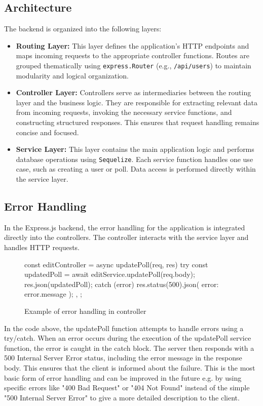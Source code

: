 \documentclass[a4paper,12pt]{report}
\begin{document}
\subsection{Architecture}
The backend is organized into the following layers:
\begin{itemize}
	\item \textbf{Routing Layer:} This layer defines the application's HTTP endpoints and maps incoming requests to the appropriate controller functions. Routes are grouped thematically using \verb|express.Router| (e.g., \verb|/api/users|) to maintain modularity and logical organization.
	
	\item \textbf{Controller Layer:} Controllers serve as intermediaries between the routing layer and the business logic. They are responsible for extracting relevant data from incoming requests, invoking the necessary service functions, and constructing structured responses. This ensures that request handling remains concise and focused.
	
	\item \textbf{Service Layer:} This layer contains the main application logic and performs database operations using \texttt{Sequelize}. Each service function handles one use case, such as creating a user or poll. Data access is performed directly within the service layer.
\end{itemize}
\subsection{Error Handling}
In the Express.js backend, the error handling for the application is integrated directly into the controllers. The controller interacts with the service layer and handles HTTP requests. 
\begin{figure}[H]
	\begin{code}
		const editController = {
			async updatePoll(req, res) {
				try {
					const updatedPoll = await editService.updatePoll(req.body);
					res.json(updatedPoll);
				} catch (error) {
					res.status(500).json({ error: error.message });
				}
			},
		};
	\end{code}
	\caption{Example of error handling in controller}
	\label{fig:controller-err}
\end{figure}
In the code above, the updatePoll function attempts to handle errors using a try/catch. When an error occurs during the execution of the updatePoll service function, the error is caught in the catch block. The server then responds with a 500 Internal Server Error status, including the error message in the response body. This ensures that the client is informed about the failure. This is the most basic form of error handling and can be improved in the future e.g. by using specific errors like "400 Bad Request" or "404 Not Found" instead of the simple "500 Internal Server Error" to give a more detailed description to the client. 
\end{document}
